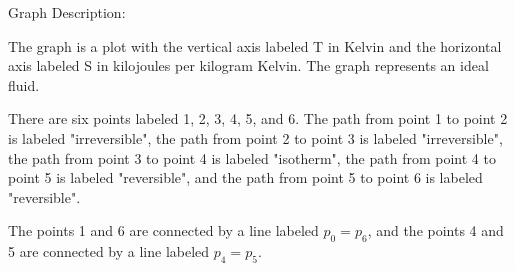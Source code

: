 Graph Description:

The graph is a plot with the vertical axis labeled T in Kelvin and the horizontal axis labeled S in kilojoules per kilogram Kelvin. The graph represents an ideal fluid.

There are six points labeled 1, 2, 3, 4, 5, and 6. The path from point 1 to point 2 is labeled "irreversible", the path from point 2 to point 3 is labeled "irreversible", the path from point 3 to point 4 is labeled "isotherm", the path from point 4 to point 5 is labeled "reversible", and the path from point 5 to point 6 is labeled "reversible".

The points 1 and 6 are connected by a line labeled \( p_0 = p_6 \), and the points 4 and 5 are connected by a line labeled \( p_4 = p_5 \).